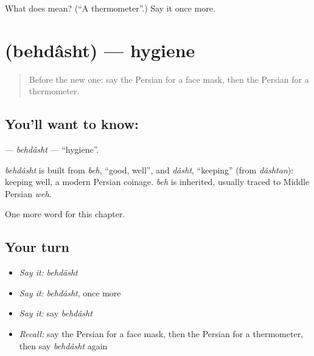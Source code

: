 \begin{tcolorbox}[breakable,colback=teal!4,colframe=teal!35!black,title={Before you move on}]
What does   mean? (\textquotedblleft{}A thermometer\textquotedblright{}.) Say it once more.
\end{tcolorbox}
\section[\texorpdfstring{\fa{بهداشت} (behdâsht)}{بهداشت (behdâsht)}]{ (behdâsht) — hygiene}

\label{lesson:FA-C190-behdasht}



\begin{quote}
Before the new one: say the Persian for a face mask, then the Persian for a thermometer.
\end{quote}

\subsection*{You'll want to know: }
\textbf{} — \emph{behdâsht} — \textquotedblleft{}hygiene\textquotedblright{}.

\begin{cousinweb}
\emph{behdâsht} is built from \emph{beh}, \textquotedblleft{}good, well\textquotedblright{}, and \emph{dâsht}, \textquotedblleft{}keeping\textquotedblright{} (from \emph{dâshtan}): keeping well, a modern Persian coinage. \emph{beh} is inherited, usually traced to Middle Persian \emph{weh}.
\end{cousinweb}

\begin{grammarlens}[title={What you've built}]
One more word for this chapter.
\end{grammarlens}

\subsection*{Your turn}
\begin{itemize}
\raggedright
  \item \emph{Say it:} \emph{behdâsht}
  \item \emph{Say it:} \emph{behdâsht}, once more
  \item \emph{Say it:} say \emph{behdâsht}
  \item \emph{Recall:} say the Persian for a face mask, then the Persian for a thermometer, then say \emph{behdâsht} again
\end{itemize}

